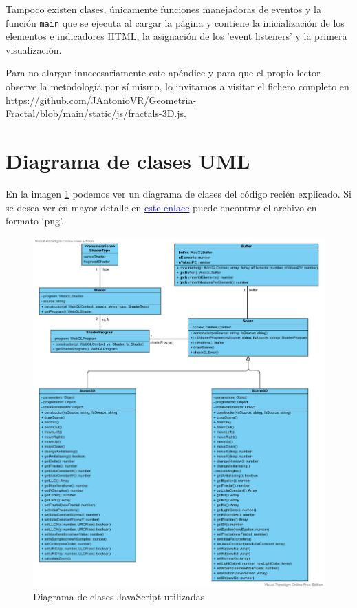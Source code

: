 Tampoco existen clases, únicamente funciones manejadoras de eventos y la función \verb|main| que se ejecuta al cargar la página y contiene la inicialización de los elementos e indicadores HTML, la asignación de los 'event listeners' y la primera visualización.

Para no alargar innecesariamente este apéndice y para que el propio lector observe la metodología por sí mismo, lo invitamos a visitar el fichero completo en \url{https://github.com/JAntonioVR/Geometria-Fractal/blob/main/static/js/fractals-3D.js}.

\newpage

\section{Diagrama de clases UML}

En la imagen \ref{fig:UML} podemos ver un diagrama de clases del código recién explicado. Si se desea ver en mayor detalle en \href{https://github.com/JAntonioVR/Geometria-Fractal/blob/main/memoria/img/UML.png}{\textcolor{blue}{este enlace}} puede encontrar el archivo en formato `png'.

\begin{figure} [ht]
\centering
\includegraphics[width = 140mm]{img/UML.png}
\caption{Diagrama de clases JavaScript utilizadas}
    \label{fig:UML}
\end{figure}